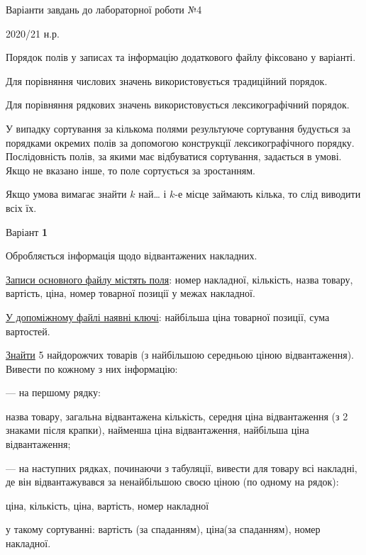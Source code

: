 \documentclass[11pt, ukrainian]{article}
\begin{document}
{\Large \center  Варіанти завдань до лабораторної роботи №4\par 2020/21 н.р.\par \bigskip\bigskip}

Порядок полів у записах та інформацію додаткового файлу фіксовано у варіанті.

Для порівняння числових значень використовується традиційний порядок.

Для порівняння рядкових значень використовується лексикографічний порядок. 

У випадку сортування за кількома полями результуюче сортування будується 
за порядками окремих полів за допомогою конструкції лексикографічного порядку. 
Послідовність полів, за якими має відбуватися сортування, задається в умові. 
Якщо не вказано інше, то поле сортується за зростанням.

Якщо умова вимагає знайти $k$ най… і $k$-е місце займають кілька, то слід виводити всіх їх.

\newpage
\par \bigskip

{\center Варіант  \No \textbf { 1 }\par}
\bigskip
Обробляється інформація щодо відвантажених накладних.

\underline{Записи основного файлу містять поля}: номер накладної, кількість, назва товару, вартість, ціна, номер товарної позиції у межах накладної.

\underline{У допоміжному файлі наявні ключі}: найбільша ціна товарної позиції, сума вартостей.

\underline{Знайти} 5 найдорожчих товарів (з найбільшою середньою ціною відвантаження). Вивести по кожному з них інформацію:\par
{\noindent}--- на першому рядку:\par
назва товару, загальна відвантажена кількість, середня ціна відвантаження (з 2 знаками після крапки), найменша ціна відвантаження,  найбільша ціна відвантаження;

{\noindent}--- на наступних рядках, починаючи з табуляції, вивести для товару всі накладні, де він відвантажувався за ненайбільшою своєю ціною (по одному на рядок):\par
ціна, кількість, ціна, вартість, номер накладної

{\noindent}у такому сортуванні: вартість (за спаданням), ціна(за спаданням), номер накладної.

\end{document}
